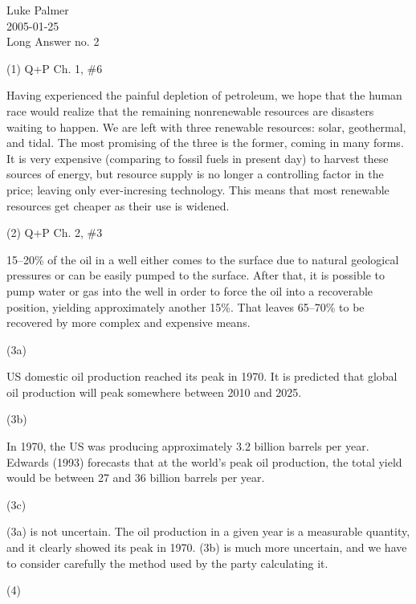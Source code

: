 \documentclass[12pt]{article}
\begin{document}
\noindent Luke Palmer \\
2005-01-25 \\
Long Answer no. 2 \\

\begin{description}
\item (1) Q+P Ch. 1, \#6

Having experienced the painful depletion of petroleum, we hope that the
human race would realize that the remaining nonrenewable resources are
disasters waiting to happen.  We are left with three renewable
resources: solar, geothermal, and tidal.  The most promising of the
three is the former, coming in many forms.  It is very expensive
(comparing to fossil fuels in present day) to harvest these sources of
energy, but resource supply is no longer a controlling factor in the
price; leaving only ever-incresing technology.  This means that
most renewable resources get cheaper as their use is widened.

\item (2) Q+P Ch. 2, \#3

15--20\% of the oil in a well either comes to the surface due to natural
geological pressures or can be easily pumped to the surface.  After
that, it is possible to pump water or gas into the well in order to
force the oil into a recoverable position, yielding approximately
another 15\%.  That leaves 65--70\% to be recovered by more complex and
expensive means.

\item (3a)

US domestic oil production reached its peak in 1970.  It is predicted
that global oil production will peak somewhere between 2010 and 2025.

\item (3b)

In 1970, the US was producing approximately 3.2 billion barrels per
year.  Edwards (1993) forecasts that at the world's peak oil production,
the total yield would be between 27 and 36 billion barrels per year.

\item (3c)

(3a) is not uncertain.  The oil production in a given year is a
measurable quantity, and it clearly showed its peak in 1970.  (3b) is
much more uncertain, and we have to consider carefully the method used
by the party calculating it.

\item (4)


\end{description}
\end{document}
